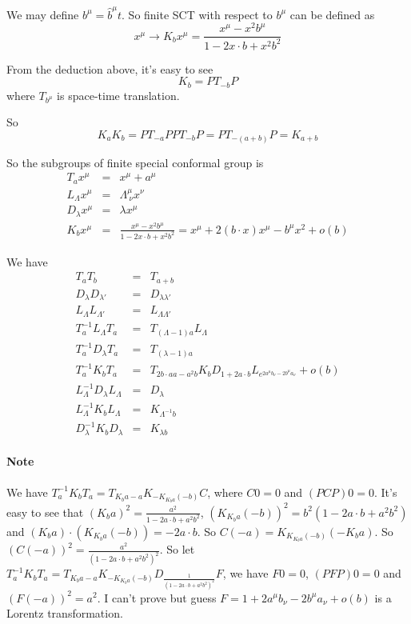 \documentclass[12pt]{book}
\begin{document}
	We may define $b^\mu=\hat b^\mu t$. So finite SCT with respect to $b^\mu$ can be defined as
	\begin{equation}
		x^\mu\rightarrow K_bx^\mu=\frac{x^\mu-x^2b^\mu}{1-2x\cdot b+x^2b^2}
	\end{equation}
	
	From the deduction above, it's easy to see
	\begin{equation}
		K_b=PT_{-b}P
	\end{equation}
	where $T_{b^\mu}$ is space-time translation.
	
	So
	\begin{equation}
		K_aK_b=PT_{-a}PPT_{-b}P=PT_{-(a+b)}P=K_{a+b}
	\end{equation}
	
	So the subgroups of finite special conformal group is
	\begin{eqnarray}
		T_{a}x^\mu&=&x^\mu+a^\mu\\
		L_{\Lambda}x^\mu&=&\Lambda^\mu_{\ \nu} x^\nu\\
		D_{\lambda}x^\mu&=&\lambda x^\mu\\
		K_{b}x^\mu&=&\frac{x^\mu-x^2b^\mu}{1-2x\cdot b+x^2b^2}=x^\mu+2(b\cdot x)x^\mu-b^\mu x^2+o(b )
	\end{eqnarray}
	
	We have            
	\begin{eqnarray}
		T_aT_b&=&T_{a+b}\\
		D_\lambda D_{\lambda'}&=&D_{\lambda\lambda'}\\
		L_{\Lambda}L_{\Lambda'}&=&L_{\Lambda\Lambda'}\\
		T_a^{-1}L_{\Lambda}T_{a}&=&T_{(\Lambda-1) a}L_{\Lambda}\\
		T_a^{-1}D_{\lambda}T_{a}&=&T_{(\lambda-1) a}\\
		T_a^{-1}K_bT_a&=&T_{2b\cdot aa-a^2b}K_bD_{1+2a\cdot b}L_{e^{2a^\mu b_\nu-2b^\mu a_\nu}}+o(b)\\
		L_{\Lambda}^{-1}D_{\lambda}L_{\Lambda}&=&D_{\lambda}\\
		L_{\Lambda}^{-1}K_bL_{\Lambda}&=&K_{\Lambda^{-1}b}\\
		D_{\lambda}^{-1}K_bD_{\lambda}&=&K_{\lambda b}
	\end{eqnarray}
	
	\paragraph{Note} We have $T_a^{-1}K_bT_a=T_{K_ba-a}K_{-K_{K_ba}(-b)}C$, where $C0=0$ and $(PCP)0=0$. It's easy to see that $(K_ba)^2=\frac {a^2}{1-2a\cdot b+a^2b^2}$, $(K_{K_ba}(-b))^2=b^2(1-2a\cdot b+a^2b^2)$ and $(K_ba)\cdot (K_{K_ba}(-b))=-2a\cdot b$. So $C(-a)=K_{K_{K_ba}(-b)}(-K_ba)$. So $(C(-a))^2=\frac{a^2}{(1-2a\cdot b+a^2b^2)^2}$. So let $T_a^{-1}K_bT_a=T_{K_ba-a}K_{-K_{K_ba}(-b)}D_{\frac 1{(1-2a\cdot b+a^2b^2)^2}}F$, we have $F0=0$, $(PFP)0=0$ and $(F(-a))^2=a^2$. I can't prove but guess $F=1+2a^\mu b_\nu-2b^\mu a_\nu+o(b)$ is a Lorentz transformation.
	
\end{document}
